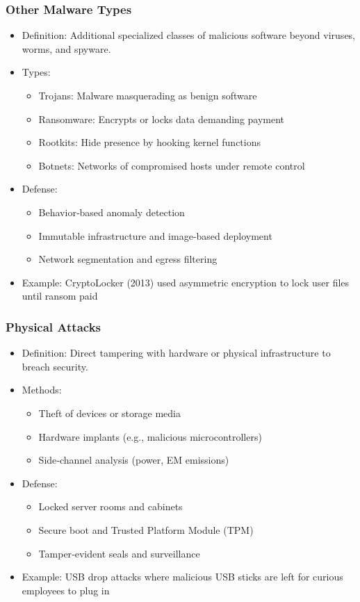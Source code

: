 \documentclass[11pt]{article}
\begin{document}
\subsubsection{Other Malware Types}
\label{sec:org8ab8d34}
\begin{itemize}
\item Definition: Additional specialized classes of malicious software beyond viruses, worms, and spyware.
\item Types:
\begin{itemize}
\item Trojans: Malware masquerading as benign software
\item Ransomware: Encrypts or locks data demanding payment
\item Rootkits: Hide presence by hooking kernel functions
\item Botnets: Networks of compromised hosts under remote control
\end{itemize}
\item Defense:
\begin{itemize}
\item Behavior‑based anomaly detection
\item Immutable infrastructure and image‑based deployment
\item Network segmentation and egress filtering
\end{itemize}
\item Example: CryptoLocker (2013) used asymmetric encryption to lock user files until ransom paid
\end{itemize}
\subsubsection{Physical Attacks}
\label{sec:org9d38682}
\begin{itemize}
\item Definition: Direct tampering with hardware or physical infrastructure to breach security.
\item Methods:
\begin{itemize}
\item Theft of devices or storage media
\item Hardware implants (e.g., malicious microcontrollers)
\item Side‑channel analysis (power, EM emissions)
\end{itemize}
\item Defense:
\begin{itemize}
\item Locked server rooms and cabinets
\item Secure boot and Trusted Platform Module (TPM)
\item Tamper‑evident seals and surveillance
\end{itemize}
\item Example: USB drop attacks where malicious USB sticks are left for curious employees to plug in
\end{itemize}
\end{document}
